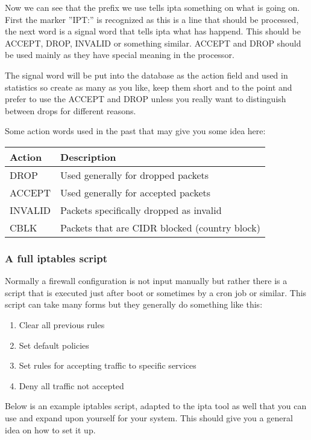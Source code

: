 \documentclass[english,twoside,openright,a4paper,12pt]{article}
\begin{document}
Now we can see that the prefix we use tells ipta something on what is going on. First the marker ''IPT:'' is recognized as this is a line that should be processed, the next word is a signal word that tells ipta what has happend. This should be ACCEPT, DROP, INVALID or something similar. ACCEPT and DROP should be used mainly as they have special meaning in the processor.

The signal word will be put into the database as the action field and used in statistics so create as many as you like, keep them short and to the point and prefer to use the ACCEPT and DROP unless you really want to distinguish between drops for different reasons.

Some action words used in the past that may give you some idea here:

\begin{table}[H]
\begin{tabular}{ll}
	\textbf{Action} & \textbf{Description  }                        \\ \hline
	DROP            & Used generally for dropped packets            \\
	ACCEPT          & Used generally for accepted packets           \\
	INVALID         & Packets specifically dropped as invalid       \\
	CBLK            & Packets that are CIDR blocked (country block)
\end{tabular}
\end{table}

\subsubsection{A full iptables script}

Normally a firewall configuration is not input manually but rather there is a script that is executed just after boot or sometimes by a cron job or similar. This script can take many forms but they generally do something like this:

\begin{enumerate}
\item Clear all previous rules
\item Set default policies
\item Set rules for accepting traffic to specific services
\item Deny all traffic not accepted
\end{enumerate}


Below is an example iptables script, adapted to the ipta tool as well that you can use and expand upon yourself for your system. This should give you a general idea on how to set it up.
\end{document}
